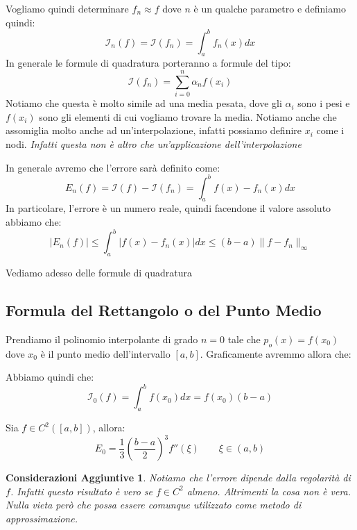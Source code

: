 \documentclass[11pt,a4paper,twoside]{article}
\newtheorem*{cons}{Considerazioni Aggiuntive}
\theoremstyle{definition}
\begin{document}
Vogliamo quindi determinare $f_n \approx f$ dove $n$ è un qualche parametro e definiamo quindi:
\[ \mathcal I_n(f) = \mathcal I(f_n) = \int_a^bf_n(x)dx \]
In generale le formule di quadratura porteranno a formule del tipo:
\[ \mathcal I(f_n) = \sum_{i = 0}^n \alpha_n f(x_i) \]
Notiamo che questa è molto simile ad una media pesata, dove gli $\alpha_i$ sono i pesi e $f(x_i)$ sono gli elementi di cui vogliamo trovare la media. Notiamo anche che assomiglia molto anche ad un'interpolazione, infatti possiamo definire $x_i$ come i nodi. \textit{Infatti questa non è altro che un'applicazione dell'interpolazione}

In generale avremo che l'errore sarà definito come:
\[ E_n(f) = \mathcal I(f) - \mathcal I(f_n) = \int_a^b f(x)-f_n(x)dx \]
In particolare, l'errore è un numero reale, quindi facendone il valore assoluto abbiamo che:
\[ |E_n(f)| \leq \int_a^b |f(x) - f_n(x)|dx \leq (b-a)\|f-f_n\|_\infty\]

Vediamo adesso delle formule di quadratura

\subsection{Formula del Rettangolo o del Punto Medio}

Prendiamo il polinomio interpolante di grado $n = 0$ tale che $p_o(x) = f(x_0)$ dove $x_0$ è il punto medio dell'intervallo $[a,b]$. Graficamente avremmo allora che:
\begin{center}
\end{center}
Abbiamo quindi che:
\[\mathcal I_0(f) = \int_a^b f(x_0)dx = f(x_0)(b-a)\]

\begin{prop}{}{}
	Sia $f\in C^2([a,b])$, allora:
	\[ E_0 = \frac 13 \left(\frac{b-a}2\right)^3 f''(\xi)\qquad \xi \in (a,b) \]
\end{prop}

\begin{cons}
	Notiamo che l'errore dipende dalla regolarità di $f$. Infatti questo risultato è vero se $f \in C^2$ almeno. Altrimenti la cosa non è vera. Nulla vieta però che possa essere comunque utilizzato come metodo di approssimazione.
\end{cons}
\end{document}

